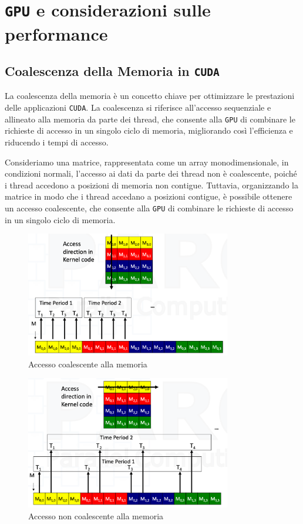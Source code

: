 \chapter{\texttt{GPU} e considerazioni sulle performance}

\section{Coalescenza della Memoria in \texttt{CUDA}}
La coalescenza della memoria è un concetto chiave per ottimizzare le prestazioni
delle applicazioni \texttt{CUDA}. La coalescenza si riferisce all'accesso
sequenziale e allineato alla memoria da parte dei thread, che consente alla
\texttt{GPU} di combinare le richieste di accesso in un singolo ciclo di
memoria, migliorando così l'efficienza e riducendo i tempi di accesso.

Consideriamo una matrice, rappresentata come un array monodimensionale,
in condizioni normali, l'accesso ai dati da parte dei thread non è
coalescente, poiché i thread accedono a posizioni di memoria non contigue.
Tuttavia, organizzando la matrice in modo che i thread accedano a posizioni
contigue, è possibile ottenere un accesso coalescente, che consente alla
\texttt{GPU} di combinare le richieste di accesso in un singolo ciclo di
memoria.
\begin{figure}[H]
  \centering
  \includegraphics[width=0.8\textwidth]{img/coalescenza.png}
  \caption{Accesso coalescente alla memoria}
\end{figure}
\begin{figure}[H]
  \centering
  \includegraphics[width=0.8\textwidth]{img/non-coalescenza.png}
  \caption{Accesso non coalescente alla memoria}
\end{figure}
